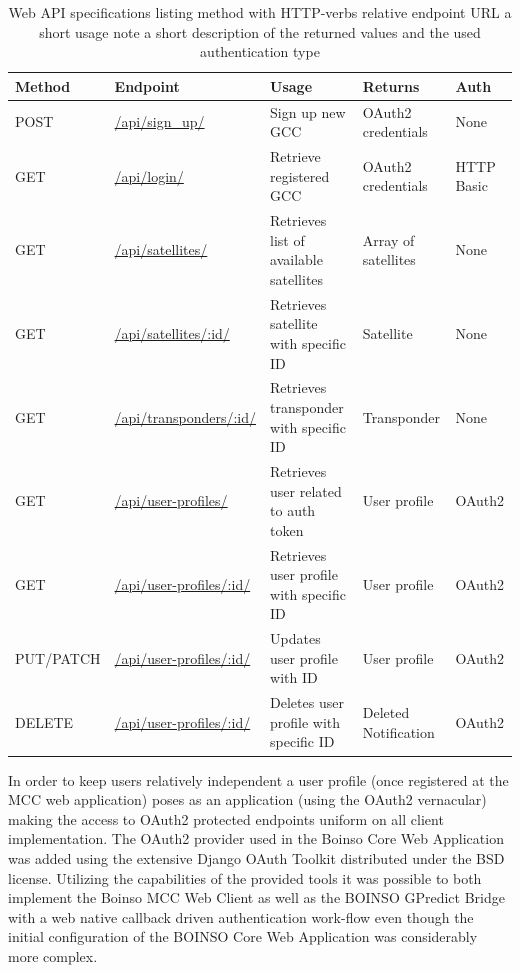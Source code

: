 \documentclass[BachelorPaper]{subfiles}
\begin{document}
\begin{table}[!htbp]
	\centering
	\begin{tabular}{| l | l | p{3.5cm} | l | l |}
		\hline
		\textbf{Method} & \textbf{Endpoint} & \textbf{Usage} & \textbf{Returns} & \textbf{Auth} \\ \hline
		POST & \url{/api/sign_up/} & Sign up new \ac{GCC} & OAuth2 credentials & None \\ \hline
		GET & \url{/api/login/} & Retrieve registered \ac{GCC} & OAuth2 credentials & HTTP Basic \\ \hline
		GET & \url{/api/satellites/} & Retrieves list of available satellites & Array of satellites & None \\ \hline
		GET & \url{/api/satellites/:id/} & Retrieves satellite with specific ID & Satellite & None \\ \hline
		GET & \url{/api/transponders/:id/} & Retrieves transponder with specific ID & Transponder & None \\ \hline
		GET & \url{/api/user-profiles/} & Retrieves user related to auth token & User profile & OAuth2 \\ \hline
		GET & \url{/api/user-profiles/:id/} & Retrieves user profile with specific ID & User profile & OAuth2 \\ \hline
		PUT/PATCH & \url{/api/user-profiles/:id/} & Updates user profile with ID & User profile & OAuth2 \\ \hline
		DELETE & \url{/api/user-profiles/:id/} & Deletes user profile with specific ID & Deleted Notification & OAuth2 \\ \hline
	\end{tabular}
	\caption{Web API specifications listing method with HTTP-verbs relative endpoint \ac{URL} a short usage note a short description of the returned values and the used authentication type}
	\label{tab:web_api_spec}
\end{table}

In order to keep users relatively independent a user profile (once registered at the \ac{MCC} web application) poses as an application (using the OAuth2 vernacular) making the access to OAuth2 protected endpoints uniform on all client implementation. The OAuth2 provider used in the Boinso Core Web Application was added using the extensive Django OAuth Toolkit distributed under the \ac{BSD} license. Utilizing the capabilities of the provided tools it was possible to both implement the Boinso MCC Web Client as well as the BOINSO GPredict Bridge with a web native callback driven authentication work-flow even though the initial configuration of the BOINSO Core Web Application was considerably more complex.\\
\end{document}
